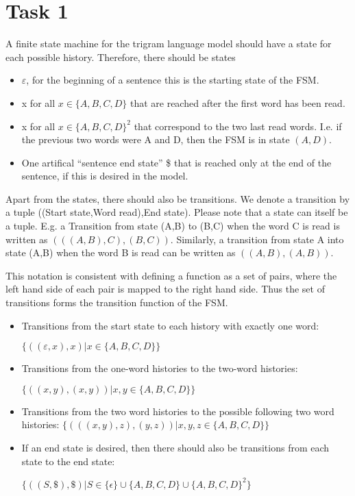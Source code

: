 \documentclass[%
   11pt,              %
   ngerman,           %
   a4paper,           %
   DIV11,             %
]{scrartcl}%
\begin{document}
\section*{Task 1}
A finite state machine for the trigram language model should have a state for each possible history. Therefore, there should be states
\begin{itemize}
    \item $\varepsilon$, for the beginning of a sentence this is the starting state of the FSM.
    \item x for all $x \in \{A,B,C,D\}$ that are reached after the first word has been read.
    \item x for all $x \in \{A,B,C,D\}^2$ that correspond to the two last read words. I.e. if the previous two words were A and D, then the FSM is in state $(A,D)$.
    \item One artifical ``sentence end state'' \$ that is reached only at the end of the sentence, if this is desired in the model.
\end{itemize}

Apart from the states, there should also be transitions. We denote a transition by a tuple ((Start state,Word read),End state). Please note that a state can itself be a tuple. E.g. a Transition from state (A,B) to (B,C) when the word C is read is written as $(((A,B),C),(B,C))$. Similarly, a transition from state A into state (A,B) when the word B is read can be written as $((A,B),(A,B))$. 

This notation is consistent with defining a function as a set of pairs, where the left hand side of each pair is mapped to the right hand side. Thus the set of transitions forms the transition function of the FSM.

\begin{itemize}
    \item Transitions from the start state to each history with exactly one word: 

    $\{((\varepsilon,x),x)| x\in\{A,B,C,D\}\}$
    \item Transitions from the one-word histories to the two-word histories:

    $\{((x,y),(x,y)) | x,y\in \{A,B,C,D\}\}$
    \item Transitions from the two word histories to the possible following two word histories:
    $\{(((x,y),z), (y,z)) | x,y,z \in \{A,B,C,D\} \}$
    \item If an end state is desired, then there should also be transitions from each state to the end state: 

    $\{((S,\$),\$) | S \in \{\epsilon\} \cup \{A,B,C,D\}\cup \{A,B,C,D\}^2\}$
\end{itemize}
\end{document}
